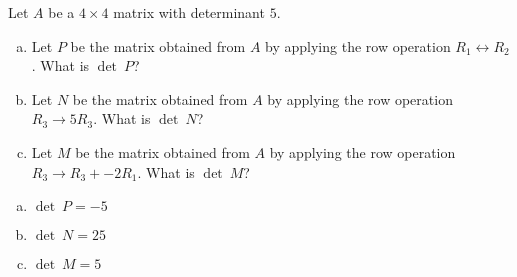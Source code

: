 
\begin{exerciseStatement}


Let \(A\) be a \(4 \times 4\) matrix with determinant \( 5 \).


\begin{enumerate}[(a)]
\item Let \(P\) be the matrix obtained from \(A\) by applying the row operation \( R_1 \leftrightarrow R_2 \). What is \(\operatorname{det}\ P\)?
\item Let \(N\) be the matrix obtained from \(A\) by applying the row operation \( R_3 \to 5R_3 \). What is \(\operatorname{det}\ N\)?
\item Let \(M\) be the matrix obtained from \(A\) by applying the row operation \( R_3 \to R_3 + -2R_1 \). What is \(\operatorname{det}\ M\)?
\end{enumerate}
    
\end{exerciseStatement}
    
\begin{exerciseAnswer} 

\begin{enumerate}[(a)]
\item \(\operatorname{det}\ P= -5 \)
\item \(\operatorname{det}\ N= 25 \)
\item \(\operatorname{det}\ M= 5 \)
\end{enumerate}
    
\end{exerciseAnswer}
    
